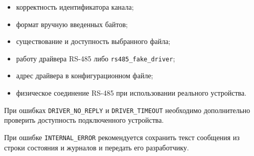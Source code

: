 \begin{itemize}
	\item корректность идентификатора канала;
	\item формат вручную введенных байтов;
	\item существование и доступность выбранного файла;
	\item работу драйвера RS-485 либо \texttt{rs485\_fake\_driver};
	\item адрес драйвера в конфигурационном файле;
	\item физическое соединение RS-485 при использовании реального устройства.
\end{itemize}

При ошибках \texttt{DRIVER\_NO\_REPLY} и \texttt{DRIVER\_TIMEOUT} необходимо
дополнительно проверить доступность подключенного устройства.

При ошибке \texttt{INTERNAL\_ERROR} рекомендуется сохранить текст сообщения
из строки состояния и журналов и передать его разработчику.